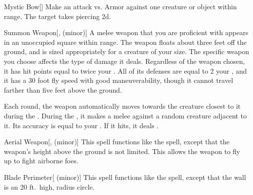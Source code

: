 \lowercase{\hypertarget{spell:Mystic Bow}{}}\label{spell:Mystic Bow}
\begin{apability}[\nth{1}]{\hypertarget{spell:Mystic Bow}{Mystic Bow}}[]
Make an attack vs. Armor against one creature or object within \rngmed range.
\hit The target takes piercing  \plus2d.
\end{apability}
\vspace{0.25em}



\lowercase{\hypertarget{spell:Summon Weapon}{}}\label{spell:Summon Weapon}
\begin{apability}[\nth{1}]{\hypertarget{spell:Summon Weapon}{Summon Weapon}}[,  (minor)]
A melee weapon that you are proficient with appears in an unoccupied square within \rngmed range.
The weapon floats about three feet off the ground, and is sized appropriately for a creature of your size.
The specific weapon you choose affects the type of damage it deals.
Regardless of the weapon chosen, it has hit points equal to twice your .
All of its defenses are equal to 2 \add your , and it has a 30 foot fly speed with good maneuverability, though it cannot travel farther than five feet above the ground.

Each round, the weapon automatically moves towards the creature closest to it during the .
During the , it makes a melee  against a random creature adjacent to it.
Its accuracy is equal to your .
If it hits, it deals .
\end{apability}
\vspace{0.25em}



\lowercase{\hypertarget{spell:Aerial Weapon}{}}\label{spell:Aerial Weapon}
\begin{apability}[\nth{2}]{\hypertarget{spell:Aerial Weapon}{Aerial Weapon}}[,  (minor)]
This spell functions like the  spell, except that the weapon's height above the ground is not limited.
This allows the weapon to fly up to fight airborne foes.
\end{apability}
\vspace{0.25em}



\lowercase{\hypertarget{spell:Blade Perimeter}{}}\label{spell:Blade Perimeter}
\begin{apability}[\nth{2}]{\hypertarget{spell:Blade Perimeter}{Blade Perimeter}}[ (minor)]
This spell functions like the  spell, except that the wall is an 20 ft.\ high, \areamed radius circle.
\end{apability}
\vspace{0.25em}



